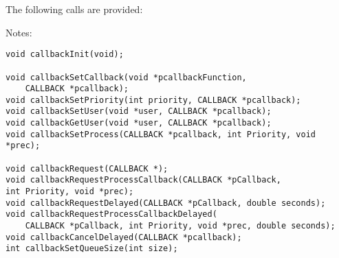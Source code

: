 The following calls are provided:

Notes:
\begin{verbatim}
void callbackInit(void);

void callbackSetCallback(void *pcallbackFunction,
    CALLBACK *pcallback);
void callbackSetPriority(int priority, CALLBACK *pcallback);
void callbackSetUser(void *user, CALLBACK *pcallback);
void callbackGetUser(void *user, CALLBACK *pcallback);
void callbackSetProcess(CALLBACK *pcallback, int Priority, void *prec);

void callbackRequest(CALLBACK *);
void callbackRequestProcessCallback(CALLBACK *pCallback,
int Priority, void *prec);
void callbackRequestDelayed(CALLBACK *pCallback, double seconds);
void callbackRequestProcessCallbackDelayed(
    CALLBACK *pCallback, int Priority, void *prec, double seconds);
void callbackCancelDelayed(CALLBACK *pcallback);
int callbackSetQueueSize(int size);
\end{verbatim}

